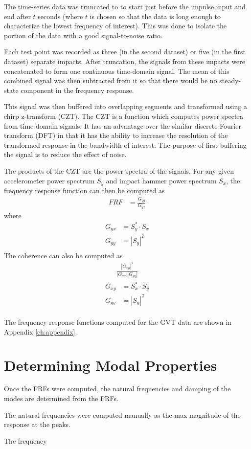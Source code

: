 The time-series data was truncated to to start just before the impulse input and end after $t$ seconds (where $t$ is chosen so that the data is long enough to characterize the lowest frequency of interest). This was done to isolate the portion of the data with a good signal-to-noise ratio.

Each test point was recorded as three (in the second dataset) or five (in the first dataset) separate impacts. After truncation, the signals from these impacts were concatenated to form one continuous time-domain signal. The mean of this combined signal was then subtracted from it so that there would be no steady-state component in the frequency response.

This signal was then buffered into overlapping segments and transformed using a chirp z-transform (CZT). The CZT is a function which computes power spectra from time-domain signals. It has an advantage over the similar discrete Fourier transform (DFT) in that it has the ability to increase the resolution of the transformed response in the bandwidth of interest. The purpose of first buffering the signal is to reduce the effect of noise.

The products of the CZT are the power spectra of the signals. For any given accelerometer power spectrum $S_y$ and impact hammer power spectrum $S_x$, the frequency response function can then be computed as
\begin{align}
    FRF &= \frac{G_{yy}}{G_{yx}}
\end{align}
where
\begin{align}
    G_{yx} &= S_y^* \cdot S_x \\
    G_{yy} &= |S_y|^2 \\
\end{align}
The coherence can also be computed as
\begin{align}
    \frac{|G_{xy}|^2}{|G_{xx}||G_{yy}|}
\end{align}
\begin{align}
    G_{xy} &= S_x^* \cdot S_y \\
    G_{yy} &= |S_y|^2 \\
\end{align}

The frequency response functions computed for the GVT data are shown in Appendix \ref{ch:appendix}.

\section{Determining Modal Properties} %

Once the FRFs were computed, the natural frequencies and damping of the modes are determined from the FRFs.

The natural frequencies were computed manually as the max magnitude of the response at the peaks.

The frequency 